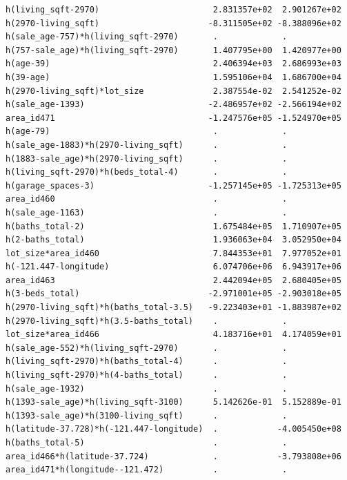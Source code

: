 \documentclass[
]{article}
\begin{document}
\begin{verbatim}
h(living_sqft-2970)                       2.831357e+02  2.901267e+02
h(2970-living_sqft)                      -8.311505e+02 -8.388096e+02
h(sale_age-757)*h(living_sqft-2970)       .             .           
h(757-sale_age)*h(living_sqft-2970)       1.407795e+00  1.420977e+00
h(age-39)                                 2.406394e+03  2.686993e+03
h(39-age)                                 1.595106e+04  1.686700e+04
h(2970-living_sqft)*lot_size              2.387554e-02  2.541252e-02
h(sale_age-1393)                         -2.486957e+02 -2.566194e+02
area_id471                               -1.247576e+05 -1.524970e+05
h(age-79)                                 .             .           
h(sale_age-1883)*h(2970-living_sqft)      .             .           
h(1883-sale_age)*h(2970-living_sqft)      .             .           
h(living_sqft-2970)*h(beds_total-4)       .             .           
h(garage_spaces-3)                       -1.257145e+05 -1.725313e+05
area_id460                                .             .           
h(sale_age-1163)                          .             .           
h(baths_total-2)                          1.675484e+05  1.710907e+05
h(2-baths_total)                          1.936063e+04  3.052950e+04
lot_size*area_id460                       7.844353e+01  7.977052e+01
h(-121.447-longitude)                     6.074706e+06  6.943917e+06
area_id463                                2.442094e+05  2.680405e+05
h(3-beds_total)                          -2.971001e+05 -2.903018e+05
h(2970-living_sqft)*h(baths_total-3.5)   -9.223403e+01 -1.883987e+02
h(2970-living_sqft)*h(3.5-baths_total)    .             .           
lot_size*area_id466                       4.183716e+01  4.174059e+01
h(sale_age-552)*h(living_sqft-2970)       .             .           
h(living_sqft-2970)*h(baths_total-4)      .             .           
h(living_sqft-2970)*h(4-baths_total)      .             .           
h(sale_age-1932)                          .             .           
h(1393-sale_age)*h(living_sqft-3100)      5.142626e-01  5.152889e-01
h(1393-sale_age)*h(3100-living_sqft)      .             .           
h(latitude-37.728)*h(-121.447-longitude)  .            -4.005450e+08
h(baths_total-5)                          .             .           
area_id466*h(latitude-37.724)             .            -3.793808e+06
area_id471*h(longitude--121.472)          .             .           
                                                                    

\end{verbatim}
\end{document}
